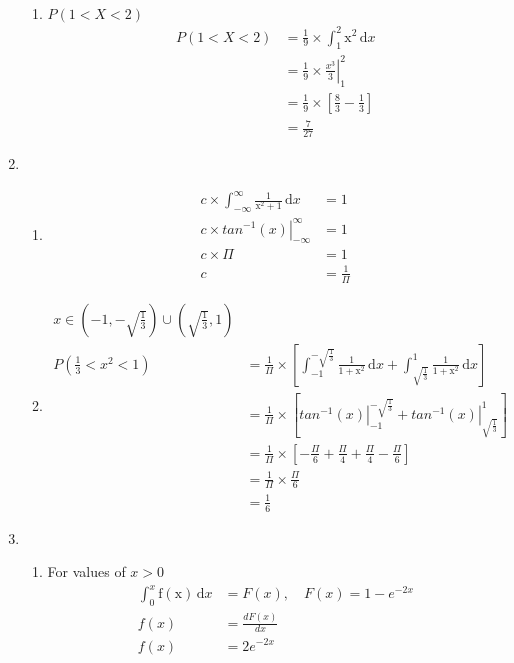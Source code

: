 \documentclass[a4paper, 12pt]{article}
\begin{document}
\begin{enumerate}
\begin{enumerate}
		\item $P(1<X<2)$
		\begin{align*}
			P(1<X<2) &= \frac{1}{9} \times 
			\int_{1}^{2} \mathrm{x^2}\,\mathrm{d}x\\
			&= \frac{1}{9} \times \left.\frac{x^3}{3}
			\right|_{1}^{2}\\
			&= \frac{1}{9} \times \left[ \frac{8}{3}
			- \frac{1}{3}\right]\\
			&= \frac{7}{27}
		\end{align*}
	\end{enumerate}		
	
	\item 
		\begin{enumerate}
		\item
			\begin{align*}
			c\times\int_{-\infty}^{\infty} \mathrm{
			\frac{1}{x^2+1}}\,\mathrm{d}x &= 1\\
			c\times\left.tan^{-1} (x)\right|_{-\infty}^
			{\infty} &= 1\\
			c \times \Pi &= 1\\
			c &= \frac{1}{\Pi}
			\end{align*}
		\item 
			\begin{align*}
			x \in \left(-1, -\sqrt{\frac{1}{3}}\right)
			\cup \left(\sqrt{\frac{1}{3}}, 1\right)\\
			P\left(\frac{1}{3}<x^2<1\right) &= \frac{1}{\Pi}
			\times\left[\int_{-1}^{-\sqrt{\frac{1}{3}}} 
			\mathrm{\frac{1}{1+x^2}}\,\mathrm{d}x + 
			\int_{\sqrt{\frac{1}{3}}}^{1} 
			\mathrm{\frac{1}{1+x^2}}\,\mathrm{d}x\right]\\
			&= \frac{1}{\Pi} \times \left[
			\left.tan^{-1} (x)\right|_{-1}^{-\sqrt{\frac{1}{3}}}
			+ \left.tan^{-1} (x)\right|_{\sqrt{\frac{1}{3}}}^{1}
			\right]\\
			&= \frac{1}{\Pi} \times \left[ -\frac{\Pi}{6}
			+ \frac{\Pi}{4} + \frac{\Pi}{4} - \frac{\Pi}{6} 
			\right]\\
			&= \frac{1}{\Pi} \times \frac{\Pi}{6}\\
			&= \frac{1}{6}
			\end{align*}
		\end{enumerate}

	\item 
	\begin{enumerate}
		\item For values of $x > 0$
		\begin{align*}
			\int_{0}^{x} \mathrm{f(x)}\,\mathrm{d}x &=
			F(x),\quad F(x) = 1 - e^{-2x}\\
			f(x) &= \frac{dF(x)}{dx}\\
			f(x) &= 2e^{-2x}
		\end{align*}
			

\end{enumerate}
\end{enumerate}
\end{document}

